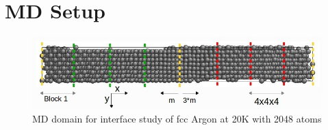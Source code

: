 \documentclass{article}
\begin{document}
\section*{MD Setup}

\begin{figure}[ht]
\centering
\includegraphics[scale=0.4]{mddom1.jpg}
\caption{MD domain for interface study of fcc Argon at 20K with 2048 atoms}
\label{fig:subfig1}
\end{figure}
\end{document}
